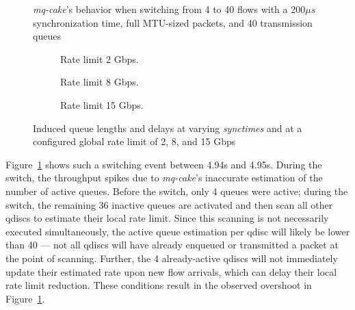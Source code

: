 %
\begin{figure}
    \centering
    
    \caption{\textit{mq-cake}'s behavior when switching from 4 to 40 flows with a 200$\mu s$ synchronization time, full MTU-sized packets, and 40 transmission queues}\label{fig:switching_200us}
\end{figure}
%
\begin{figure*}
    \begin{subfigure}{0.3\linewidth}
        \centering
        
        \caption{Rate limit 2 Gbps.}\label{fig:qlen_qdel_200us_2}
    \end{subfigure}
    \hfill
    \begin{subfigure}{0.3\linewidth}
        \centering
        
        \caption{Rate limit 8 Gbps.}\label{fig:qlen_qdel_200us_8}
    \end{subfigure}
    \hfill
    \begin{subfigure}{0.3\linewidth}
        \centering
        
        \caption{Rate limit 15 Gbps.}\label{fig:qlen_qdel_200us_15}
    \end{subfigure}
    \caption{Induced queue lengths and delays at varying \textit{synctimes} and at a configured global rate limit of 2, 8, and 15 Gbps}\label{fig:qlen_qdel}
\end{figure*}

Figure~\ref{fig:switching_200us} shows such a switching event between 4.94s and 4.95s.
%
During the switch, the throughput spikes due to \textit{mq-cake}'s inaccurate estimation of the number of active queues.
%
Before the switch, only 4 queues were active; during the switch, the remaining 36 inactive queues are activated and then scan all other qdiscs to estimate their local rate limit.
%
Since this scanning is not necessarily executed simultaneously, the active queue estimation per qdisc will likely be lower than 40 --- not all qdiscs will have already enqueued or transmitted a packet at the point of scanning.
%
Further, the 4 already-active qdiscs will not immediately update their estimated rate upon new flow arrivals, which can delay their local rate limit reduction.
%
These conditions result in the observed overshoot in Figure~\ref{fig:switching_200us}.
%


